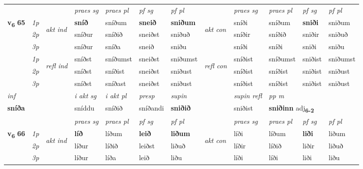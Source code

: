\begin{longtable}[l]{X>{\footnotesize\itshape}llXXXXlXXXX}
 & &   & \textit{praes sg}  & \textit{praes pl}    & \textit{ pf sg} & \textit{pf pl} & & \textit{praes sg}  & \textit{praes pl}    & \textit{pf sg} & \textit{pf pl }  \\ \cmidrule{4-7} \cmidrule{9-12}
 \multirow{2}{*}{{{\textbf{v{\textsubscript{6}}} \Large{\textbf{65}}}}}  & 1p & \multirow{3}{*}{\begin{turn}{90}\textit{akt ind}\end{turn}} & \textbf{sníð} & sníðum & \textbf{sneið} & \textbf{sniðum} & \multirow{3}{*}{\begin{turn}{90}\textit{akt con}\end{turn}} &sníði & sníðum & \textbf{sniði} & sniðum\\*
 & 2p &  &  sníður  & sníðið & sneiðst & sniðuð & & sníðir & sníðið & sniðir & sniðuð \\*
 & 3p &  & sníður & sníða & sneið & sniðu & & sníði & sníði& sniði & sniðu \\*
\cmidrule{4-7} \cmidrule{9-12}
 & 1p & \multirow{3}{*}{\begin{turn}{90}\textit{refl ind}\end{turn}}  & sníðst & sníðumst & sneiðst & sniðumst & \multirow{3}{*}{\begin{turn}{90}\textit{refl con}\end{turn}}  &sníðist & sníðumst & sniðist & sniðumst \\*
 & 2p &  & sníðst & sníðist & sneiðst & sniðust & &sníðist & sníðist & sniðist & sniðust \\*
 & 3p  & & sníðst & sníðast & sneiðst & sniðust & & sníðist & sníðist& sniðist & sniðust \\*
\cmidrule{4-7} \cmidrule{9-12}

   {\textit{inf}} & &  & \textit{i akt sg} & \textit{i akt pl}   & \textit{presp} & \textit{supin} && \textit{supin refl} & \textit{pp m} \\*
  {\textbf{sníða}} & && sníddu  & sníðið   & sníðandi &  \textbf{sniðið} && sniðist & \multicolumn{2}{l}{\textbf{sniðinn} adj\textbf{\textsubscript{6-2}}} \\*

\midrule

 & &   & \textit{praes sg}  & \textit{praes pl}    & \textit{ pf sg} & \textit{pf pl} & & \textit{praes sg}  & \textit{praes pl}    & \textit{pf sg} & \textit{pf pl }  \\ \cmidrule{4-7} \cmidrule{9-12}
 \multirow{2}{*}{{{\textbf{v{\textsubscript{6}}} \Large{\textbf{66}}}}}  & 1p & \multirow{3}{*}{\begin{turn}{90}\textit{akt ind}\end{turn}} & \textbf{líð} & líðum & \textbf{leið} & \textbf{liðum} & \multirow{3}{*}{\begin{turn}{90}\textit{akt con}\end{turn}} &líði & líðum & \textbf{liði} & liðum\\*
 & 2p &  &  líður  & líðið & leiðst & liðuð & & líðir & líðið & liðir & liðuð \\*
 & 3p &  & líður & líða & leið & liðu & & líði & líði& liði & liðu \\*
\cmidrule{4-7} \cmidrule{9-12}


\end{longtable}
